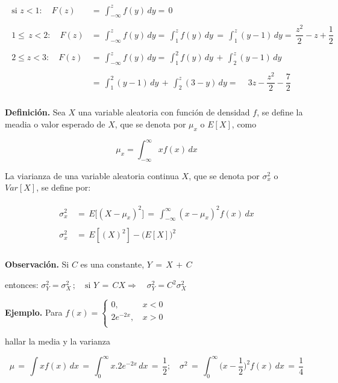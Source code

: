 \documentclass[11pt, a4paper]{article} %
\makeatletter
\newcommand{\mathleft}{\@fleqntrue\@mathmargin0pt}
\newcommand{\mathcenter}{\@fleqnfalse}
\makeatother
\begin{document}
\begin{align}
\begin{aligned}
\text{si } z<1: \quad F(z)&=\, \int_{-\infty}^{z} f(y) \, dy = \, 0 
\\ \nonumber \\
1 \leq \, z<2: \quad F(z)&=\, \int_{-\infty}^{z} f(y) \, dy = 
\, \int_{1}^{z} f(y) \, dy \, = \, \int_{1}^{z} (y-1) \, dy = \, \dfrac{z^2}{2} - z + \dfrac{1}{2} 
\\ \nonumber \\
2 \leq z<3: \quad F(z)&=\, \int_{-\infty}^{z} f(y) \, dy = 
\, \int_{1}^{2} f(y) \, dy \, + \, \int_{2}^{z} (y-1) \, dy
\\ \nonumber \\
&=\, \int_{1}^{2} (y-1) \, dy \, + \, \int_{2}^{z} (3-y) \, dy = \quad \, 3z- \dfrac{z^2}{2} - \dfrac{7}{2}
\\
\end{aligned}
\end{align}

\textbf{Definición.} Sea \(X\) una variable aleatoria con función de densidad \(f\), se define la meadia o valor esperado de \(X\), que se denota por \(\mu_x\) o \(E[X]\), como

\mathcenter
\[
\mu_x = \int_{-\infty}^{\infty} xf(x) \, dx
\]

La viarianza de una variable aleatoria continua \(X\), que se denota por \(\sigma_x^2\) o \(Var[X]\), se define por:

\begin{align}
	\begin{aligned}	
		\sigma_x^2 \, &= \, E \big[ (X- \mu_x)^2 \big] \, = \, \int_{-\infty}^{\infty} (x- \mu_x)^2f(x) \, dx
		\\ \nonumber \\
		\sigma_x^2 \, &= \, E[(X)^2]- \big( E[X] \big)^2
		\\ \nonumber
	\end{aligned}
\end{align}

\textbf{Observación.} Si \(C\) es una constante,
\(
Y \, = \, X \, + \, C
\)

entonces:
\(
\sigma_Y^2 = \sigma_X^2 \, ; \quad \text{si } Y \, = \, CX \Rightarrow \quad \sigma_Y^2 = C^2\sigma_X^2
\)

\vspace{1\baselineskip}
\textbf{Ejemplo.} Para 
\(
f(x)=
	\left\{ \begin{aligned}
	0, \qquad &x<0\\ \nonumber
	2e^{-2x}, &x>0\\
	\end{aligned}
	\right.
\)

hallar la media y la varianza

\mathleft
\[
\mu \, = \, \int xf(x) \, dx \,
=
\, \int_0^\infty x.2e^{-2x} \, dx \,
=
\, \dfrac{1}{2}; \quad \sigma^2 \, 
=
\, \int_0^\infty \Big( x- \dfrac{1}{2} \Big)^2 f(x) \, dx \,
=
\, \dfrac{1}{4}
\]
\end{document}
